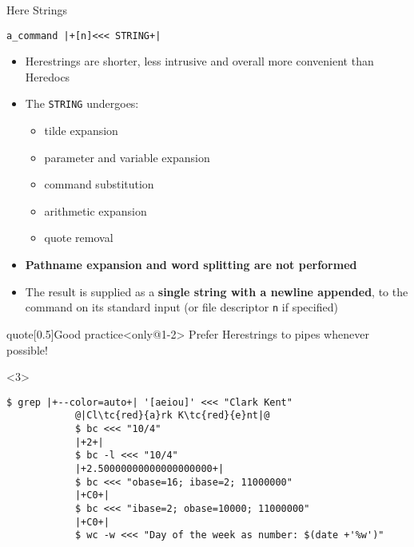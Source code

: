 \begin{frame}[fragile]{Here Strings}
    \vspace{-1mm}
    \begin{lstlisting}[style=MyBash, numbers=none]
        a_command |+[n]<<< STRING+|
    \end{lstlisting}
    \vspace{3mm}
    \begin{itemize}[<only@1-2>]
        \item Herestrings are shorter, less intrusive and overall more convenient than Heredocs\\[-0.5ex]
        \item The \texttt{STRING} undergoes:
              \begin{itemize}
                  \item tilde expansion
                  \item parameter and variable expansion
                  \item command substitution
                  \item arithmetic expansion
                  \item quote removal
              \end{itemize}
        \item \textbf{Pathname expansion and word splitting are not performed}
        \item The result is supplied as a \alert{\textbf{single string with a newline appended}}, to the command on its standard input (or file descriptor \texttt{n} if specified)
    \end{itemize}
    \begin{varblock}{quote}[0.5\textwidth]{Good practice}<only@1-2>
        \textnormal{Prefer Herestrings to pipes whenever possible!}
    \end{varblock}
    \begin{onlyenv}<3>
        \begin{lstlisting}[style=MyBash, aboveskip=0mm, style=oddnumbers]
            $ grep |+--color=auto+| '[aeiou]' <<< "Clark Kent"
            @|Cl\tc{red}{a}rk K\tc{red}{e}nt|@
            $ bc <<< "10/4"
            |+2+|
            $ bc -l <<< "10/4"
            |+2.50000000000000000000+|
            $ bc <<< "obase=16; ibase=2; 11000000"
            |+C0+|
            $ bc <<< "ibase=2; obase=10000; 11000000"
            |+C0+|
            $ wc -w <<< "Day of the week as number: $(date +'%w')"

\end{lstlisting}
\end{onlyenv}
\end{frame}
